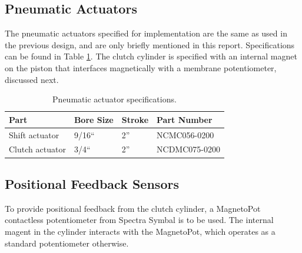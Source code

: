 \subsection{Pneumatic Actuators}

The pneumatic actuators specified for implementation are the same as used in the previous design, and are only briefly mentioned in this report. Specifications can be found in Table \ref{tab:cylinder_specs}. The clutch cylinder is specified with an internal magnet on the piston that interfaces magnetically with a membrane potentiometer, discussed next.

\begin{table}[H]
 \caption{Pneumatic actuator specifications.\label{tab:cylinder_specs}}
  \centering
  \begin{tabular}{|l|l|l|l|}
   \hline
   Part & Bore Size & Stroke & Part Number \tabularnewline
    \hline
    \hline
    Shift actuator & 9/16`` & 2'' & NCMC056-0200 \tabularnewline
    \hline
    Clutch actuator & 3/4`` & 2'' & NCDMC075-0200 \tabularnewline
    \hline
  \end{tabular}
\end{table}

\subsection{Positional Feedback Sensors}

To provide positional feedback from the clutch cylinder, a MagnetoPot contactless potentiometer from Spectra Symbal is to be used. The internal magent in the cylinder interacts with the MagnetoPot, which operates as a standard potentiometer otherwise.
